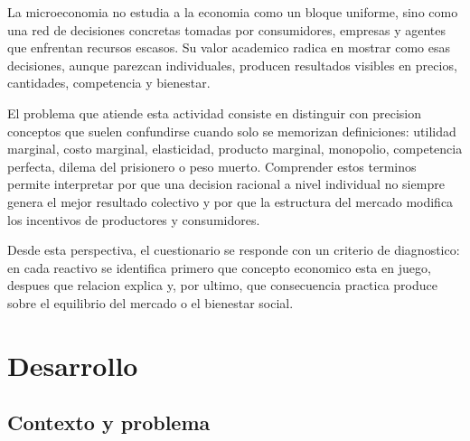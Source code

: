 \documentclass[
	spanish,
	letterpaper, oneside
]{article}
\begin{document}
La microeconomia no estudia a la economia como un bloque uniforme, sino como una red de decisiones concretas tomadas por consumidores, empresas y agentes que enfrentan recursos escasos. Su valor academico radica en mostrar como esas decisiones, aunque parezcan individuales, producen resultados visibles en precios, cantidades, competencia y bienestar.

El problema que atiende esta actividad consiste en distinguir con precision conceptos que suelen confundirse cuando solo se memorizan definiciones: utilidad marginal, costo marginal, elasticidad, producto marginal, monopolio, competencia perfecta, dilema del prisionero o peso muerto. Comprender estos terminos permite interpretar por que una decision racional a nivel individual no siempre genera el mejor resultado colectivo y por que la estructura del mercado modifica los incentivos de productores y consumidores.

Desde esta perspectiva, el cuestionario se responde con un criterio de diagnostico: en cada reactivo se identifica primero que concepto economico esta en juego, despues que relacion explica y, por ultimo, que consecuencia practica produce sobre el equilibrio del mercado o el bienestar social.

%
%
\section{Desarrollo}

\subsection{Contexto y problema}
\end{document}
